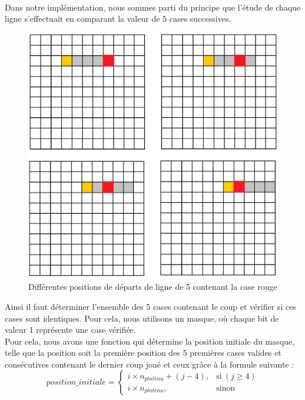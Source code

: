 \documentclass[a4paper,11pt]{article}
\begin{document}
\begin{itemize}
    \\Dans notre implémentation, nous sommes parti du principe que l'étude de chaque ligne s'effectuait en comparant la valeur de 5 cases successives.
    \begin{figure}[h]
    \centering
    \includegraphics[scale=0.15]{horizontal.png}
    \caption{Différentes positions de départs de ligne de 5 contenant la case rouge}
    \label{fig:horizontal}
    \end{figure}
      Ainsi il faut déterminer l'ensemble des 5 cases contenant le coup et vérifier si ces cases sont identiques. Pour cela, nous utilisons un masque, où chaque bit de valeur 1 représente une case vérifiée. \\
      Pour cela, nous avons une fonction qui détermine la position initiale du masque, telle que la position soit la première position des 5 premières cases valides et consécutives contenant le dernier coup joué et ceux grâce à la formule suivante :
  \begin{equation}
  \label{pos_init}
    position\_initiale=
    \begin{cases}
      i\times n_{plateau}+(j-4), & \text{si}\ (j \geqslant 4) \\
      i\times n_{plateau}, & \text{sinon}
    \end{cases}
  \end{equation}

\end{itemize}
\end{document}
